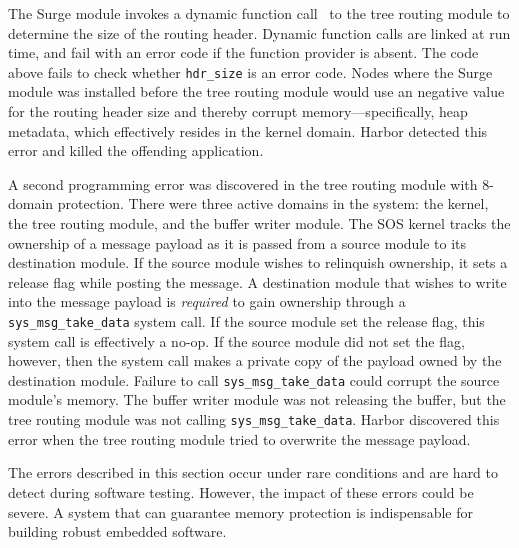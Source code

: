 \noindent
%
The Surge module invokes a dynamic function call~\cite{ram05sos} to
the tree routing module to determine the size of the routing header.
%
Dynamic function calls are linked at run time, and fail with an error
code if the function provider is absent.
%
The code above fails to check whether \verb+hdr_size+ is an error code.
%
Nodes where the Surge module was installed before the tree routing module
would use an negative value for the routing header size and thereby corrupt
memory---specifically, heap metadata, which effectively resides in the
kernel domain.
%
Harbor detected this error and killed the offending application.


%
A second programming error was discovered in the tree routing module with
8-domain protection.
%
There were three active domains in the system: the kernel, the tree routing
module, and the buffer writer module.
%
The SOS kernel tracks the ownership of a message payload as it is passed from a source module to its destination module.
%
If the source module wishes to relinquish ownership, it sets a release flag while posting the message.
%
A destination module that wishes to write into the message payload is
\emph{required} to gain ownership through a \verb+sys_msg_take_data+ system
call.  If the source module set the release flag, this system call is
effectively a no-op.  If the source module did not set the flag, however,
then the system call makes a private copy of the payload owned by the
destination module.
%
Failure to call \verb+sys_msg_take_data+ could corrupt the source module's
memory.
%
The buffer writer module was not releasing the buffer, but the tree routing
module was not calling \verb+sys_msg_take_data+.
%
Harbor discovered this error when the tree routing module tried to
overwrite the message payload.
%

The errors described in this section occur under rare conditions and
are hard to detect during software testing.
%
However, the impact of these errors could be severe.
%
A system that can guarantee memory protection is indispensable for
building robust embedded software.






















